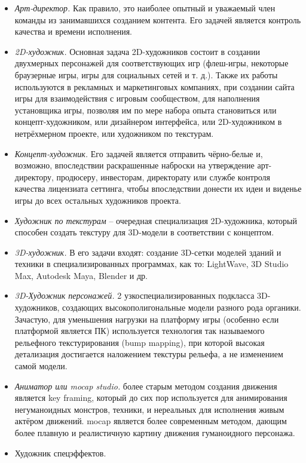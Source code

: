 \begin{itemize}
    \item \emph{Арт-директор.} Как правило, это наиболее опытный и уважаемый член команды из занимавшихся 
        созданием контента. Его задачей является контроль качества и времени исполнения.
    \item \emph{2D-художник.} Основная задача 2D-художников состоит в создании двухмерных персонажей для 
        соответствующих игр (флеш-игры, некоторые браузерные игры, игры для социальных сетей и т. д.). Также 
        их работы используются в рекламных и маркетинговых компаниях, при создании сайта игры для 
        взаимодействия с игровым сообществом, для наполнения установщика игры, позволяя им по мере набора 
        опыта становиться или концепт-художником, или дизайнером интерфейса, или 2D-художником в 
        нетрёхмерном проекте, или художником по текстурам.
    \item \emph{Концепт-художник.} Его задачей является отправить чёрно-белые и, возможно, впоследствии 
        раскрашенные наброски на утверждение арт-директору, продюсеру, инвесторам, директорату или службе 
        контроля качества лицензиата сеттинга, чтобы впоследствии донести их идеи и виденье игры до всех 
        остальных художников проекта.
    \item \emph{Художник по текстурам} -- очередная специализация 2D-художника, который способен создать 
        текстуру для 3D-модели в соответствии с концептом.
    \item \emph{3D-художник.} В его задачи входят: создание 3D-сетки моделей зданий и техники в 
        специализированных программах, как то: LightWave, 3D Studio Max, Autodesk Maya, Blender и др.
    \item \emph{3D-Художник персонажей.} 2 узкоспециализированных подкласса 3D-художников, создающих 
        высокополигональные модели разного рода органики. Зачастую, для уменьшения нагрузки на платформу 
        игры (особенно если платформой является ПК) используется технология так называемого рельефного 
        текстурирования (bump mapping), при которой высокая детализация достигается наложением текстуры 
        рельефа, а не изменением самой модели.
    \item \emph{Аниматор или mocap studio.} более старым методом создания движения является key framing, 
        который до сих пор используется для анимирования негуманоидных монстров, техники, и нереальных для 
        исполнения живым актёром движений. mocap является более современным методом, дающим более плавную и 
        реалистичную картину движения гуманоидного персонажа.
    \item Художник спецэффектов.
\end{itemize}

